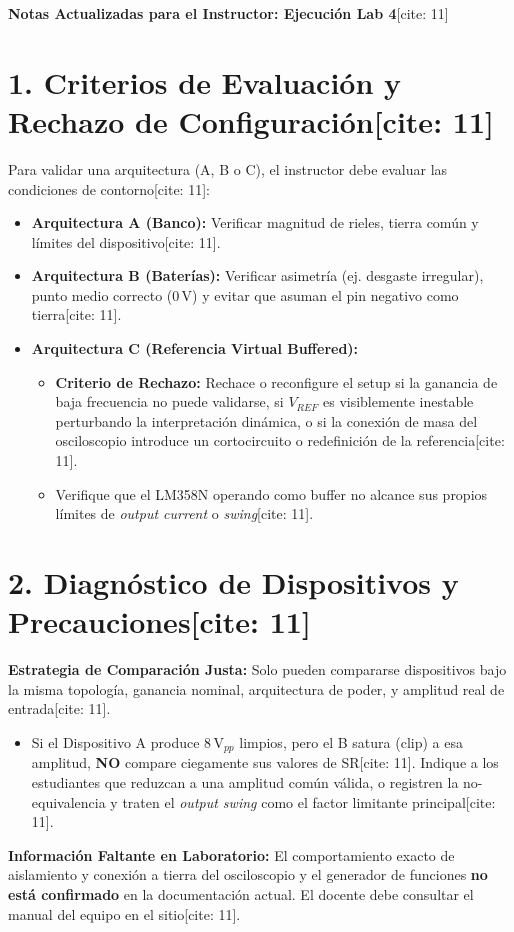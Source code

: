 \documentclass[11pt, a4paper]{article}
\begin{document}
\begin{center}
    \Large\textbf{\textcolor{ucbblue}{Notas Actualizadas para el Instructor: Ejecución Lab 4}}[cite: 11]
\end{center}

\section*{1. Criterios de Evaluación y Rechazo de Configuración[cite: 11]}
Para validar una arquitectura (A, B o C), el instructor debe evaluar las condiciones de contorno[cite: 11]:
\begin{itemize}
    \item \textbf{Arquitectura A (Banco):} Verificar magnitud de rieles, tierra común y límites del dispositivo[cite: 11].
    \item \textbf{Arquitectura B (Baterías):} Verificar asimetría (ej. desgaste irregular), punto medio correcto ($0\,\text{V}$) y evitar que asuman el pin negativo como tierra[cite: 11].
    \item \textbf{Arquitectura C (Referencia Virtual Buffered):}
    \begin{itemize}
        \item \textbf{Criterio de Rechazo:} Rechace o reconfigure el setup si la ganancia de baja frecuencia no puede validarse, si $V_{REF}$ es visiblemente inestable perturbando la interpretación dinámica, o si la conexión de masa del osciloscopio introduce un cortocircuito o redefinición de la referencia[cite: 11].
        \item Verifique que el LM358N operando como buffer no alcance sus propios límites de \textit{output current} o \textit{swing}[cite: 11].
    \end{itemize}
\end{itemize}

\section*{2. Diagnóstico de Dispositivos y Precauciones[cite: 11]}
\textbf{Estrategia de Comparación Justa:} Solo pueden compararse dispositivos bajo la misma topología, ganancia nominal, arquitectura de poder, y amplitud real de entrada[cite: 11].
\begin{itemize}
    \item Si el Dispositivo A produce $8\,\text{V}_{pp}$ limpios, pero el B satura (clip) a esa amplitud, \textbf{NO} compare ciegamente sus valores de SR[cite: 11]. Indique a los estudiantes que reduzcan a una amplitud común válida, o registren la no-equivalencia y traten el \textit{output swing} como el factor limitante principal[cite: 11].
\end{itemize}
\textbf{Información Faltante en Laboratorio:} El comportamiento exacto de aislamiento y conexión a tierra del osciloscopio y el generador de funciones \textbf{no está confirmado} en la documentación actual. El docente debe consultar el manual del equipo en el sitio[cite: 11].
\end{document}
